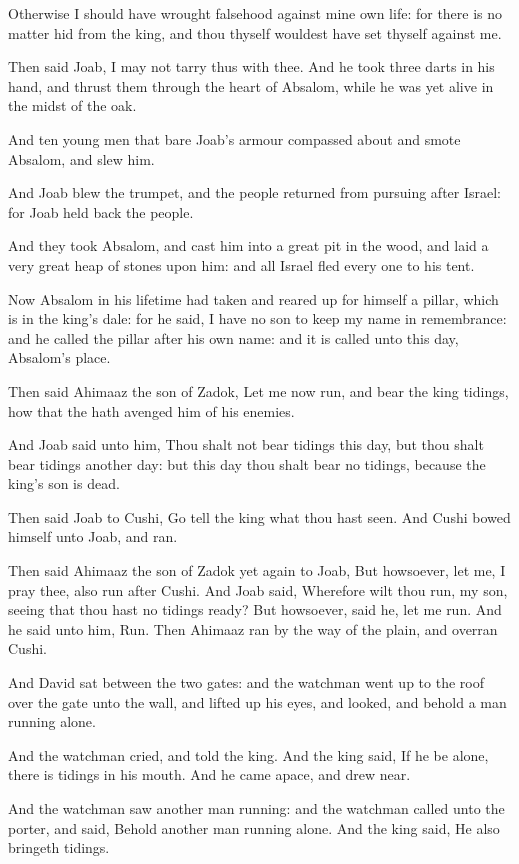 \verse Otherwise I should have wrought falsehood against mine own life: for there is no matter hid from the king, and thou thyself wouldest have set thyself against me.

\verse Then said Joab, I may not tarry thus with thee. And he took three darts in his hand, and thrust them through the heart of Absalom, while he was yet alive in the midst of the oak.

\verse And ten young men that bare Joab's armour compassed about and smote Absalom, and slew him.

\verse And Joab blew the trumpet, and the people returned from pursuing after Israel: for Joab held back the people.

\verse And they took Absalom, and cast him into a great pit in the wood, and laid a very great heap of stones upon him: and all Israel fled every one to his tent.

\verse Now Absalom in his lifetime had taken and reared up for himself a pillar, which is in the king's dale: for he said, I have no son to keep my name in remembrance: and he called the pillar after his own name: and it is called unto this day, Absalom's place.

\verse Then said Ahimaaz the son of Zadok, Let me now run, and bear the king tidings, how that the \LORD hath avenged him of his enemies.

\verse And Joab said unto him, Thou shalt not bear tidings this day, but thou shalt bear tidings another day: but this day thou shalt bear no tidings, because the king's son is dead.

\verse Then said Joab to Cushi, Go tell the king what thou hast seen.  And Cushi bowed himself unto Joab, and ran.

\verse Then said Ahimaaz the son of Zadok yet again to Joab, But howsoever, let me, I pray thee, also run after Cushi. And Joab said, Wherefore wilt thou run, my son, seeing that thou hast no tidings ready?  \verse But howsoever, said he, let me run. And he said unto him, Run. Then Ahimaaz ran by the way of the plain, and overran Cushi.

\verse And David sat between the two gates: and the watchman went up to the roof over the gate unto the wall, and lifted up his eyes, and looked, and behold a man running alone.

\verse And the watchman cried, and told the king. And the king said, If he be alone, there is tidings in his mouth. And he came apace, and drew near.

\verse And the watchman saw another man running: and the watchman called unto the porter, and said, Behold another man running alone.  And the king said, He also bringeth tidings.

